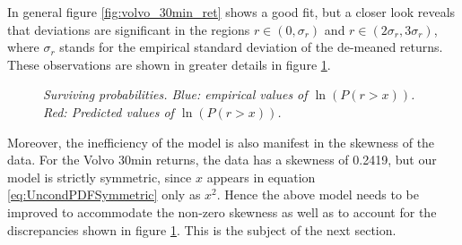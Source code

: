 In general figure \ref{fig:volvo_30min_ret} shows a good fit, but a
closer look reveals that deviations are significant in the regions $r
\in (0, \sigma_r)$ and $r \in (2\sigma_r, 3\sigma_r)$, where
$\sigma_r$ stands for the empirical standard deviation of the
de-meaned returns. These observations are
shown in greater details in figure \ref{fig:volvo_30min_ret2}.
\begin{figure}[htb!]
  \centering
  \caption{\small \it Surviving probabilities. Blue: empirical values of $\ln(P(r
    > x))$. Red: Predicted values of $\ln(P(r > x))$.}
  \label{fig:volvo_30min_ret2}
\end{figure}

Moreover, the inefficiency of the model is also manifest in the
skewness of the data. For the Volvo 30min returns, the data has a
skewness of 0.2419, but our model is strictly symmetric, since
$x$ appears in equation \ref{eq:UncondPDFSymmetric} only as $x^2$.
Hence the above model needs to be improved to accommodate the non-zero
skewness as well as to account for the discrepancies shown in figure
\ref{fig:volvo_30min_ret2}. This is the subject of the next section.

